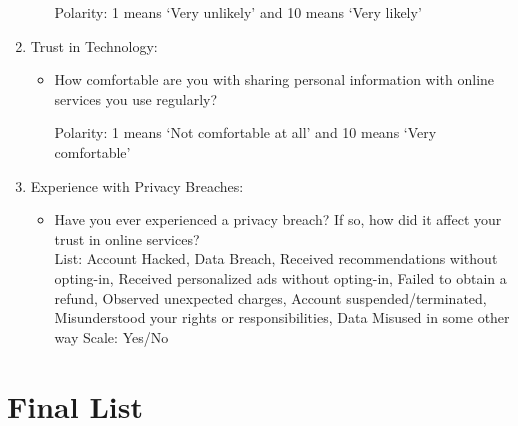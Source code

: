 \begin{enumerate}
\begin{itemize}
        Polarity: 1 means ‘Very unlikely’ and 10 means ‘Very likely’
    \end{itemize}
\item Trust in Technology:
    \begin{itemize}

        \item How comfortable are you with sharing personal information with online services you use regularly?

        Polarity: 1 means ‘Not comfortable at all’ and 10 means ‘Very comfortable’
    \end{itemize}
\item Experience with Privacy Breaches:
    \begin{itemize}
        \item Have you ever experienced a privacy breach? If so, how did it affect your trust in online services? 
        \\
        List: Account Hacked, Data Breach, Received recommendations without opting-in, Received personalized ads without opting-in, Failed to obtain a refund, Observed unexpected charges, Account suspended/terminated, Misunderstood your rights or responsibilities, Data Misused in some other way
        Scale: Yes/No        

        

    \end{itemize}
\end{enumerate}




\section{Final List}

